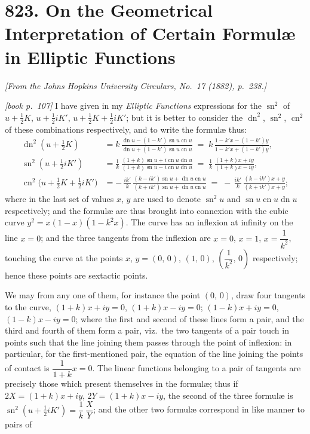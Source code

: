 \documentclass[11pt,a4paper]{article}
\theoremstyle{plain}
\theoremstyle{definition}
\theoremstyle{remark}
\DeclareMathOperator{\sn}{sn}
\DeclareMathOperator{\cn}{cn}
\DeclareMathOperator{\dn}{dn}
\begin{document}
\section*{823. On the Geometrical Interpretation of Certain Formul\ae{} in Elliptic Functions}

\begin{center}
\textit{[From the Johns Hopkins University Circulars, No.\ 17 (1882), p.~238.]}
\end{center}

\noindent\textit{[book p.~107]} I have given in my \textit{Elliptic Functions} expressions for the $\sn^2$ of $u + \tfrac{1}{2}K$, $u + \tfrac{1}{2}iK'$, $u + \tfrac{1}{2}K + \tfrac{1}{2}iK'$; but it is better to consider the $\dn^2$, $\sn^2$, $\cn^2$ of these combinations respectively, and to write the formul\ae{} thus:
\begin{align*}
\dn^2(u + \tfrac{1}{2}K) &= k\,\frac{\dn u - (1 - k')\sn u\cn u}{\dn u + (1 - k')\sn u\cn u}
   \;=\; k\,\frac{1 - k'\!x - (1 - k')y}{1 - k'\!x + (1 - k')y},\\[2pt]
\sn^2(u + \tfrac{1}{2}iK') &= \frac{1}{k}\,\frac{(1 + k)\sn u + i\cn u\dn u}{(1 + k)\sn u - i\cn u\dn u}
   \;=\; \frac{1}{k}\,\frac{(1 + k)x + iy}{(1 + k)x - iy},\\[2pt]
\cn^2\bigl(u + \tfrac{1}{2}K + \tfrac{1}{2}iK'\bigr) &= -\,\frac{ik'}{k}\,\frac{(k - ik')\sn u + \dn u\cn u}{(k + ik')\sn u + \dn u\cn u}
   \;=\; -\,\frac{ik'}{k}\,\frac{(k - ik')x + y}{(k + ik')x + y};
\end{align*}
where in the last set of values $x$, $y$ are used to denote $\sn^2 u$ and $\sn u\cn u\dn u$ respectively; and the formul\ae{} are thus brought into connexion with the cubic curve $y^2 = x(1 - x)(1 - k^2 x)$. The curve has an inflexion at infinity on the line $x = 0$; and the three tangents from the inflexion are $x = 0$, $x = 1$, $x = \dfrac{1}{k^2}$, touching the curve at the points $x$, $y = (0,\,0)$, $(1,\,0)$, $\left(\dfrac{1}{k^2},\,0\right)$ respectively; hence these points are sextactic points.

We may from any one of them, for instance the point $(0,\,0)$, draw four tangents to the curve, $(1 + k)x + iy = 0$, $(1 + k)x - iy = 0$; $(1 - k)x + iy = 0$, $(1 - k)x - iy = 0$; where the first and second of these lines form a pair, and the third and fourth of them form a pair, viz.\ the two tangents of a pair touch in points such that the line joining them passes through the point of inflexion: in particular, for the first-mentioned pair, the equation of the line joining the points of contact is $\dfrac{1}{1 + k}x = 0$. The linear functions belonging to a pair of tangents are precisely those which present themselves in the formul\ae; thus if $2X = (1 + k)x + iy$, $2Y = (1 + k)x - iy$, the second of the three formul\ae{} is $\sn^2(u + \tfrac{1}{2}iK') = \dfrac{1}{k}\,\dfrac{X}{Y}$; and the other two formul\ae{} correspond in like manner to pairs of
\end{document}
